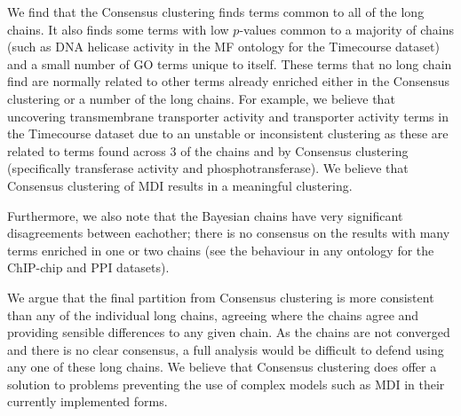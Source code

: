 \documentclass[]{article}
\begin{document}
We find that the Consensus clustering finds terms common to all of the long chains. It also finds some terms with low $p$-values common to a majority of chains (such as DNA helicase activity in the MF ontology for the Timecourse dataset) and a small number of GO terms unique to itself. These terms that no long chain find are normally related to other terms already enriched either in the Consensus clustering or a number of the long chains. For example, we believe that uncovering transmembrane transporter activity and transporter activity terms in the Timecourse dataset due to an unstable or inconsistent clustering as these are related to terms found across 3 of the chains and by Consensus clustering (specifically transferase activity and phosphotransferase). We believe that Consensus clustering of MDI results in a meaningful clustering.

Furthermore, we also note that the Bayesian chains have very significant disagreements between eachother; there is no consensus on the results with many terms enriched in one or two chains (see the behaviour in any ontology for the ChIP-chip and PPI datasets). 

We argue that the final partition from Consensus clustering is more consistent than any of the individual long chains, agreeing where the chains agree and providing sensible differences to any given chain. As the chains are not converged and there is no clear consensus, a full analysis would be difficult to defend using any one of these long chains. We believe that Consensus clustering does offer a solution to problems preventing the use of complex models such as MDI in their currently implemented forms.

%
\end{document}
